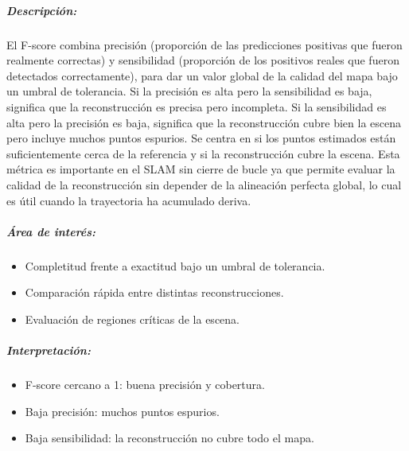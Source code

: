 \documentclass[12pt, a4paper, twoside]{article}
\begin{document}
\subparagraph{Descripción:}
El F-score\cite{Caccia2018FScore} combina precisión (proporción de las predicciones positivas que fueron realmente correctas) y sensibilidad (proporción de los positivos reales que fueron detectados correctamente), 
para dar un valor global de la calidad del mapa bajo un umbral de tolerancia. Si la precisión es alta pero la sensibilidad es baja, significa que la reconstrucción es precisa pero incompleta.
Si la sensibilidad es alta pero la precisión es baja, significa que la reconstrucción cubre bien la escena pero incluye muchos puntos espurios.
Se centra en si los puntos estimados están suficientemente cerca de la referencia y si la reconstrucción cubre la escena.
Esta métrica es importante en el SLAM\cite{smith1987slam} sin cierre de bucle ya que permite evaluar la calidad de la reconstrucción sin depender de la alineación 
perfecta global, lo cual es útil cuando la trayectoria ha acumulado deriva.
\subparagraph{Área de interés:}
\begin{itemize}
  \item Completitud frente a exactitud bajo un umbral de tolerancia.
  \item Comparación rápida entre distintas reconstrucciones.
  \item Evaluación de regiones críticas de la escena.
\end{itemize}

\subparagraph{Interpretación:}
\begin{itemize}
  \item F-score\cite{Caccia2018FScore} cercano a 1: buena precisión y cobertura.  
  \item Baja precisión: muchos puntos espurios.
  \item Baja sensibilidad: la reconstrucción no cubre todo el mapa.
\end{itemize}
\end{document}
